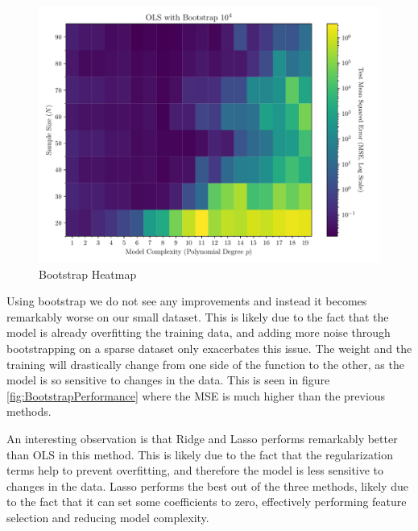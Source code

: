 \documentclass[twocolumn,aps]{revtex4}
\begin{document}
\begin{figure}[h]
    \centering
    \includegraphics[width=.95 \linewidth]{Figures/Bootstrap_Heatmap.pdf}
    \caption{Bootstrap Heatmap}
    \label{fig:BootstrapHeatmap}
\end{figure}

Using bootstrap we do not see any improvements and instead it becomes remarkably worse on our small dataset.
This is likely due to the fact that the model is already overfitting the training data, and adding more noise through bootstrapping on a sparse dataset only exacerbates this issue.
The weight and the training will drastically change from one side of the function to the other, as the model is so sensitive to changes in the data.
This is seen in figure \ref{fig:BootstrapPerformance} where the MSE is much higher than the previous methods.

An interesting observation is that Ridge and Lasso performs remarkably better than OLS in this method.
This is likely due to the fact that the regularization terms help to prevent overfitting, and therefore the model is less sensitive to changes in the data.
Lasso performs the best out of the three methods, likely due to the fact that it can set some coefficients to zero, effectively performing feature selection and reducing model complexity.
\end{document}

